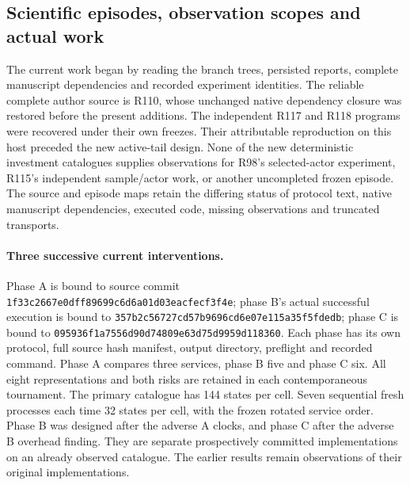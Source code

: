 \subsection{Scientific episodes, observation scopes and actual work}
\label{dev:execution119}
The current work began by reading the branch trees, persisted reports,
complete manuscript dependencies and recorded experiment identities. The
reliable complete author source is R110, whose unchanged native dependency
closure was restored before the present additions. The independent R117 and
R118 programs were recovered under their own freezes. Their attributable
reproduction on this host preceded the new active-tail design. None of the
new deterministic investment catalogues supplies observations for R98's
selected-actor experiment, R115's independent sample/actor work, or another
uncompleted frozen episode. The source and episode maps retain the differing
status of protocol text, native manuscript dependencies, executed code,
missing observations and truncated transports.

\paragraph{Three successive current interventions.}
Phase A is bound to source commit
\nolinkurl{1f33c2667e0dff89699c6d6a01d03eacfecf3f4e}; phase B's actual successful
execution is bound to
\nolinkurl{357b2c56727cd57b9696cd6e07e115a35f5fdedb}; phase C is bound to
\nolinkurl{095936f1a7556d90d74809e63d75d9959d118360}.
Each phase has its own protocol, full source hash manifest, output directory,
preflight and recorded command. Phase A compares three services, phase B five
and phase C six. All eight representations and both risks are retained in
each contemporaneous tournament. The primary catalogue has 144 states per
cell. Seven sequential fresh processes each time 32 states per cell, with
the frozen rotated service order. Phase B was designed after the adverse A
clocks, and phase C after the adverse B overhead finding. They are separate
prospectively committed implementations on an already observed catalogue.
The earlier results remain observations of their original implementations.

